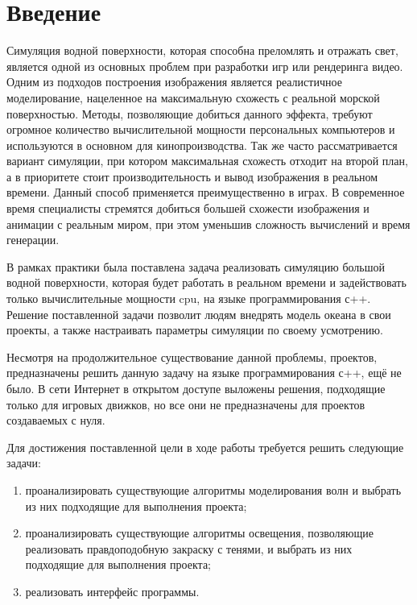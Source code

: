 	\chapter*{Введение}
	
	Симуляция водной поверхности, которая способна преломлять и отражать свет, является одной из основных проблем при разработки игр или рендеринга видео. Одним из подходов построения изображения является реалистичное моделирование, нацеленное на максимальную схожесть с реальной морской поверхностью. Методы, позволяющие добиться данного эффекта, требуют огромное количество вычислительной мощности персональных компьютеров и используются в основном для кинопроизводства. Так же часто рассматривается вариант симуляции, при котором максимальная схожесть отходит на второй план, а в приоритете стоит производительность и вывод изображения в реальном времени. Данный способ применяется преимущественно в играх. В современное время специалисты стремятся добиться большей схожести изображения и анимации с реальным миром, при этом уменьшив сложность вычислений и время генерации.
	
	В рамках практики была поставлена задача реализовать симуляцию большой водной поверхности, которая будет работать в реальном времени и задействовать только вычислительные мощности cpu, на языке программирования с++. Решение поставленной задачи позволит людям внедрять модель океана в свои проекты, а также настраивать параметры симуляции по своему усмотрению.
	
	Несмотря на продолжительное существование данной проблемы, проектов, предназначены решить данную задачу на языке программирования с++, ещё не было. В сети Интернет в открытом доступе выложены решения, подходящие только для игровых движков, но все они не предназначены для проектов создаваемых с нуля.
	
	Для достижения поставленной цели в ходе работы требуется решить следующие задачи: 
	\begin{enumerate}
		\item проанализировать существующие алгоритмы моделирования волн и выбрать из них подходящие для выполнения проекта;
		\item проанализировать существующие алгоритмы освещения, позволяющие реализовать правдоподобную закраску с тенями, и выбрать из них подходящие для выполнения проекта;
		\item реализовать интерфейс программы.
	\end{enumerate}